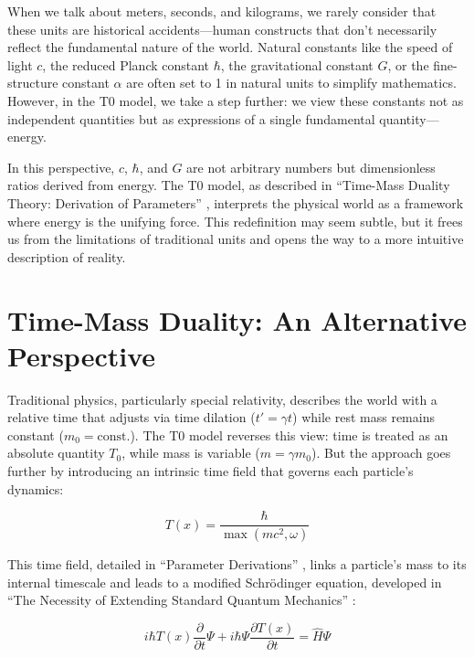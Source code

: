 \documentclass[a4paper,12pt]{article}
\newcommand{\Tfield}{T(x)}
\begin{document}
	When we talk about meters, seconds, and kilograms, we rarely consider that these units are historical accidents—human constructs that don’t necessarily reflect the fundamental nature of the world. Natural constants like the speed of light \(c\), the reduced Planck constant \(\hbar\), the gravitational constant \(G\), or the fine-structure constant \(\alpha\) are often set to 1 in natural units to simplify mathematics. However, in the T0 model, we take a step further: we view these constants not as independent quantities but as expressions of a single fundamental quantity—energy.
	
	In this perspective, \(c\), \(\hbar\), and \(G\) are not arbitrary numbers but dimensionless ratios derived from energy. The T0 model, as described in “Time-Mass Duality Theory: Derivation of Parameters” \cite{pascher_params_2025}, interprets the physical world as a framework where energy is the unifying force. This redefinition may seem subtle, but it frees us from the limitations of traditional units and opens the way to a more intuitive description of reality.
	
	\section{Time-Mass Duality: An Alternative Perspective}
	
	Traditional physics, particularly special relativity, describes the world with a relative time that adjusts via time dilation (\(t' = \gamma t\)) while rest mass remains constant (\(m_0 = \text{const.}\)). The T0 model reverses this view: time is treated as an absolute quantity \(T_0\), while mass is variable (\(m = \gamma m_0\)). But the approach goes further by introducing an intrinsic time field that governs each particle’s dynamics:
	
	\begin{equation}
		\Tfield = \frac{\hbar}{\max(m c^2, \omega)}
	\end{equation}
	
	This time field, detailed in “Parameter Derivations” \cite{pascher_params_2025}, links a particle’s mass to its internal timescale and leads to a modified Schrödinger equation, developed in “The Necessity of Extending Standard Quantum Mechanics” \cite{pascher_quantum_2025}:
	
	\begin{equation}
		i\hbar \Tfield \frac{\partial}{\partial t} \Psi + i\hbar \Psi \frac{\partial \Tfield}{\partial t} = \hat{H} \Psi
	\end{equation}
	
\end{document}
